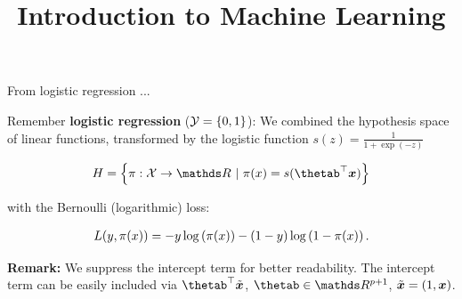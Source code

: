 



\newcommand{\titlefigure}{figure_man/softmax1.png}
\newcommand{\learninggoals}{
  \item \textcolor{blue}{Know what softmax regression means}
  \item \textcolor{blue}{Softmax regression vs logistic regression}
  \item \textcolor{blue}{Softmax regression as a linear discriminator}
}

\title{Introduction to Machine Learning}
\date{}




\sloppy


\begin{vbframe}{From logistic regression ...}

Remember \textbf{logistic regression} ($\mathcal{Y} = \{0, 1\}$): We combined the hypothesis space of linear functions, transformed by the logistic function $s(z) = \frac{1}{1 + \exp(- z)}$

\vspace*{-0.3cm}

\begin{eqnarray*}
  \Hspace = \left\{\pi: \Xspace \to \R ~|~\pix = s(\thetab^\top \xv)\right\}
\end{eqnarray*}

with the Bernoulli (logarithmic) loss: 

\begin{eqnarray*}
  L(y, \pi(x)) = -y \log \left(\pi(x)\right) - (1 - y) \log \left(1 - \pi(x)\right).
\end{eqnarray*}

\vfill

\begin{footnotesize}
  \textbf{Remark:} We suppress the intercept term for better readability. The intercept term can be easily included via $\thetab^\top \tilde\xv$, $\thetab \in \R^{p + 1}$, $\tilde{\bm{x}} = (1, \bm{x})$.
\end{footnotesize}

\end{vbframe}

